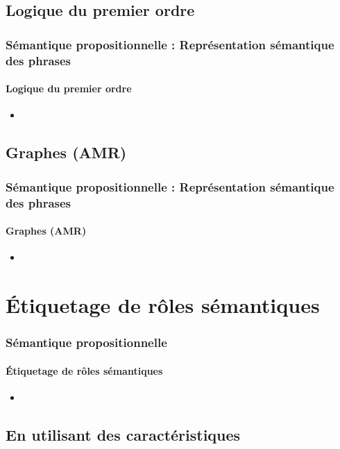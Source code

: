 \documentclass[xcolor=table]{beamer}
\begin{document}
\subsection{Logique du premier ordre}

\begin{frame}
	\frametitle{Sémantique propositionnelle : Représentation sémantique des phrases}
	\framesubtitle{Logique du premier ordre}
	
	\begin{itemize}
		\item 
	\end{itemize}
	
\end{frame}

\subsection{Graphes (AMR)}

\begin{frame}
	\frametitle{Sémantique propositionnelle : Représentation sémantique des phrases}
	\framesubtitle{Graphes (AMR)}
	
	\begin{itemize}
		\item 
	\end{itemize}
	
\end{frame}

\section{Étiquetage de rôles sémantiques}

\begin{frame}
	\frametitle{Sémantique propositionnelle}
	\framesubtitle{Étiquetage de rôles sémantiques}
	
	\begin{itemize}
		\item 
	\end{itemize}
	
\end{frame}

\subsection{En utilisant des caractéristiques}
\end{document}
